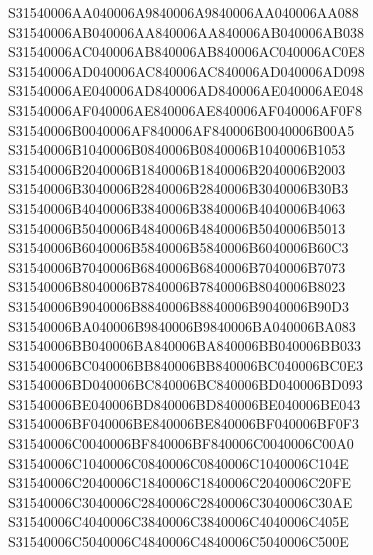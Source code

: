 \documentclass[12pt,a4paper]{article}
\begin{document}
\begin{framed}
{S31540006AA040006A9840006A9840006AA040006AA088\newline
S31540006AB040006AA840006AA840006AB040006AB038\newline
S31540006AC040006AB840006AB840006AC040006AC0E8\newline
S31540006AD040006AC840006AC840006AD040006AD098\newline
S31540006AE040006AD840006AD840006AE040006AE048\newline
S31540006AF040006AE840006AE840006AF040006AF0F8\newline
S31540006B0040006AF840006AF840006B0040006B00A5\newline
S31540006B1040006B0840006B0840006B1040006B1053\newline
S31540006B2040006B1840006B1840006B2040006B2003\newline
S31540006B3040006B2840006B2840006B3040006B30B3\newline
S31540006B4040006B3840006B3840006B4040006B4063\newline
S31540006B5040006B4840006B4840006B5040006B5013\newline
S31540006B6040006B5840006B5840006B6040006B60C3\newline
S31540006B7040006B6840006B6840006B7040006B7073\newline
S31540006B8040006B7840006B7840006B8040006B8023\newline
S31540006B9040006B8840006B8840006B9040006B90D3\newline
S31540006BA040006B9840006B9840006BA040006BA083\newline
S31540006BB040006BA840006BA840006BB040006BB033\newline
S31540006BC040006BB840006BB840006BC040006BC0E3\newline
S31540006BD040006BC840006BC840006BD040006BD093\newline
S31540006BE040006BD840006BD840006BE040006BE043\newline
S31540006BF040006BE840006BE840006BF040006BF0F3\newline
S31540006C0040006BF840006BF840006C0040006C00A0\newline
S31540006C1040006C0840006C0840006C1040006C104E\newline
S31540006C2040006C1840006C1840006C2040006C20FE\newline
S31540006C3040006C2840006C2840006C3040006C30AE\newline
S31540006C4040006C3840006C3840006C4040006C405E\newline
S31540006C5040006C4840006C4840006C5040006C500E\newline
}
\end{framed}
\end{document}
